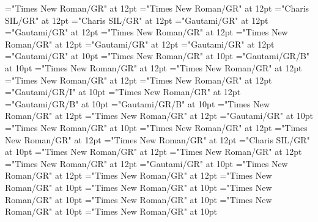 \documentclass[c5paper,twoside]{article}
\begin{document}
\pagestyle{plain}
\sloppy
\setlength{\parfillskip}{0pt plus 1fil}
\font\diven="Times New Roman/GR" at 12pt
\font\spanen="Times New Roman/GR" at 12pt
\font\divggofonipaxemic="Charis SIL/GR" at 12pt
\font\spanggofonipaxemic="Charis SIL/GR" at 12pt
\font\divte="Gautami/GR" at 12pt
\font\spante="Gautami/GR" at 12pt
\font\divhi="Times New Roman/GR" at 12pt
\font\spanhi="Times New Roman/GR" at 12pt
\font\divggoTeluIN="Gautami/GR" at 12pt
\font\spanggoTeluIN="Gautami/GR" at 12pt
\font\xitemte="Gautami/GR" at 10pt
\font\xitemhi="Times New Roman/GR" at 10pt
\font\xitemxitemcomplexformformbefore="Gautami/GR/B" at 10pt
\font\xitemxitemcomplexformrefsbefore="Times New Roman/GR" at 12pt
\font\xitemxitemdefinitionbefore="Times New Roman/GR" at 12pt
\font\xitemxitementryrefcomponentbefore="Times New Roman/GR" at 12pt
\font\xitemxitementryreftypebefore="Times New Roman/GR" at 12pt
\font\xitemxitemexamplebefore="Gautami/GR/I" at 10pt
\font\xitemxitemexamplesbefore="Times New Roman/GR" at 12pt
\font\xitemxitemheadwordbefore="Gautami/GR/B" at 10pt
\font\xitemxitemLexEntrypublishStemComponentTargetMLHeadWordPubbefore="Gautami/GR/B" at 10pt
\font\xitemxitemLexEntryTypepublishStemComplexFormTypeReverseAbbrPubbefore="Times New Roman/GR" at 12pt
\font\xitemxitemLexEntryTypepublishStemEntryTypeAbbreviationPubbefore="Times New Roman/GR" at 12pt
\font\xitemxitemLexSensepublishStemGlossPubLdbefore="Gautami/GR" at 10pt
\font\xitemxitemLexSensepublishStemGlossPubLebefore="Times New Roman/GR" at 10pt
\font\xitemxitempartofspeechbefore="Times New Roman/GR" at 12pt
\font\xitemxitempictureLabelbefore="Times New Roman/GR" at 12pt
\font\xitemxitemprimaryrefsbefore="Times New Roman/GR" at 12pt
\font\xitemxitempronunciationbefore="Charis SIL/GR" at 10pt
\font\xitemxitempronunciationsbefore="Times New Roman/GR" at 12pt
\font\sensesensesensesbefore="Times New Roman/GR" at 12pt
\font\xitemxitemtranslationbefore="Times New Roman/GR" at 12pt
\font\xitemxitemtranslationLdbefore="Gautami/GR" at 10pt
\font\xitemtpi="Times New Roman/GR" at 12pt
\font{}="Times New Roman/GR" at 12pt
\font\entryletDatadicBody="Times New Roman/GR" at 10pt
\font\pictureRightentryletDatadicBody="Times New Roman/GR" at 10pt
\font\picturepictureRightentryletDatadicBody="Times New Roman/GR" at 10pt
\font\pictureCaptionpictureRightentryletDatadicBody="Times New Roman/GR" at 10pt
\font\CmPicturepublishStemPileThumbnailPubpictureCaptionpictureRightentryletDatadicBody="Times New Roman/GR" at 10pt
\font\CmPicturepublishStemPileThumbnailPubafterpictureCaptionpictureRightentryletDatadicBody="Times New Roman/GR" at 10pt
\end{document}

